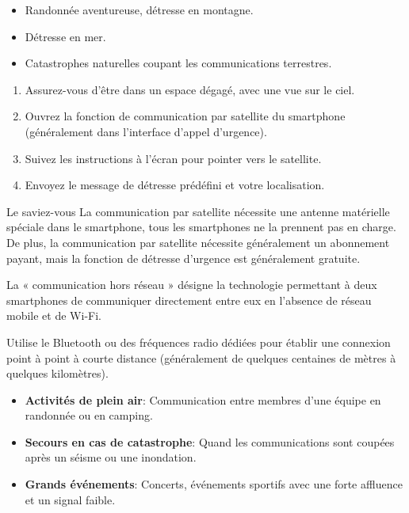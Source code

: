 
\begin{itemize}
  \item Randonnée aventureuse, détresse en montagne.
  \item Détresse en mer.
  \item Catastrophes naturelles coupant les communications terrestres.
\end{itemize}


\begin{enumerate}
  \item Assurez-vous d'être dans un espace dégagé, avec une vue sur le ciel.
  \item Ouvrez la fonction de communication par satellite du smartphone (généralement dans l'interface d'appel d'urgence).
  \item Suivez les instructions à l'écran pour pointer vers le satellite.
  \item Envoyez le message de détresse prédéfini et votre localisation.
\end{enumerate}

\begin{tcbinfo}{Le saviez-vous}
La communication par satellite nécessite une antenne matérielle spéciale dans le smartphone, tous les smartphones ne la prennent pas en charge. De plus, la communication par satellite nécessite généralement un abonnement payant, mais la fonction de détresse d'urgence est généralement gratuite.

\end{tcbinfo}


La « communication hors réseau » désigne la technologie permettant à deux smartphones de communiquer directement entre eux en l'absence de réseau mobile et de Wi-Fi.


Utilise le Bluetooth ou des fréquences radio dédiées pour établir une connexion point à point à courte distance (généralement de quelques centaines de mètres à quelques kilomètres).


\begin{itemize}
  \item \textbf{Activités de plein air}: Communication entre membres d'une équipe en randonnée ou en camping.
  \item \textbf{Secours en cas de catastrophe}: Quand les communications sont coupées après un séisme ou une inondation.
  \item \textbf{Grands événements}: Concerts, événements sportifs avec une forte affluence et un signal faible.
\end{itemize}

